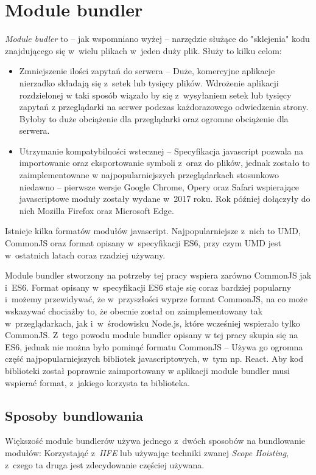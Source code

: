 \documentclass{SGGW-thesis}
\begin{document}
\chapter{Module bundler}
\emph{Module budler} to -- jak wspomniano wyżej -- narzędzie służące do "sklejenia" kodu znajdującego się w~wielu plikach w~jeden duży plik. Służy to kilku celom:
\begin{itemize}
    \item Zmniejszenie ilości zapytań do serwera -- Duże, komercyjne aplikacje nierzadko składają się z~setek lub tysięcy plików. Wdrożenie aplikacji rozdzielonej w taki sposób wiązało by się z~wysyłaniem setek lub tysięcy zapytań z przeglądarki na serwer podczas każdorazowego odwiedzenia strony. Byłoby to duże obciążenie dla przeglądarki oraz ogromne obciążenie dla serwera.
    \item Utrzymanie kompatybilności wstecznej -- Specyfikacja javascript pozwala na importowanie oraz eksportowanie symboli z~oraz do plików, jednak zostało to zaimplementowane w najpopularniejszych przeglądarkach stosunkowo niedawno -- pierwsze wersje Google Chrome, Opery oraz Safari wspierające javascriptowe moduły zostały wydane w~2017 roku. Rok później dołączyły do nich Mozilla Firefox oraz Microsoft Edge.\cite{es6_modules_support}
\end{itemize}

Istnieje kilka formatów modułów javascript. Najpopularniejsze z~nich to UMD, CommonJS oraz format opisany w~specyfikacji ES6, przy czym UMD jest w~ostatnich latach coraz rzadziej używany.\cite{es6_for_humans}

Module bundler stworzony na potrzeby tej pracy wspiera zarówno CommonJS jak i~ES6. Format opisany w~specyfikacji ES6 staje się coraz bardziej popularny i~możemy przewidywać, że w~przyszłości wyprze format CommonJS, na co może wskazywać chociażby to, że obecnie został on zaimplementowany tak w~przeglądarkach, jak i~w~środowisku Node.js, które wcześniej wspierało tylko CommonJS\cite{nodejs_modules}. Z~tego powodu module bundler opisany w tej pracy skupia się na ES6, jednak nie można było pominąć formatu CommonJS -- Używa go ogromna część najpopularniejszych bibliotek javascriptowych, w~tym np. React. Aby kod biblioteki został poprawnie zaimportowany w aplikacji module bundler musi wspierać format, z~jakiego korzysta ta biblioteka.


\section{Sposoby bundlowania}
Większość module bundlerów używa jednego z~dwóch sposobów na bundlowanie modułów: Korzystająć z~\emph{IIFE} lub używając techniki zwanej \emph{Scope Hoisting}, z~czego ta druga jest zdecydowanie częściej używana\cite{parcel_scope_hoisting}.
\end{document}
